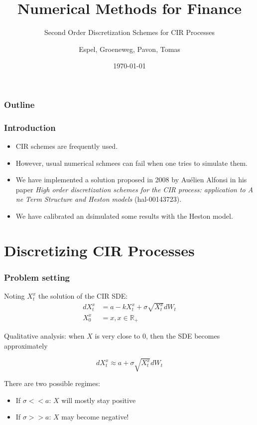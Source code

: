 \documentclass[12pt]{beamer}
\title{Numerical Methods for Finance}
\subtitle{Second Order Discretization Schemes for CIR Processes}
\author{Espel, Groeneweg, Pavon, Tomas}
\institute{Imperial College London}
\date{\today}
\begin{document}
\begin{frame}
    \titlepage
\end{frame}


\begin{frame}
\frametitle{Outline}
\tableofcontents
\end{frame}

\begin{frame}
\frametitle{Introduction}
\begin{itemize}
  \item CIR schemes are frequently used.
  \item However, usual numerical schmees can fail when one tries to simulate them.
  \item We have implemented a solution proposed in 2008 by Auélien Alfonsi in his paper \textit{High order discretization schemes for the CIR process: application to A ne Term Structure and Heston models} (hal-00143723).
  \item We have calibrated an dsimulated some results with the Heston model.
\end{itemize}
\end{frame}


\section{Discretizing CIR Processes}
\frame{\tableofcontents[currentsection]}

\begin{frame}
\frametitle{Problem setting}
Noting $X^{x}_{t}$ the solution of the CIR SDE:
\begin{align*}
dX^{x}_{t} & = a - kX^{x}_{t} + \sigma \sqrt{X^{x}_{t}} dW_{t} \\
X^{x}_{0} & = x, x \in \mathbb{R_{+}}
\end{align*}

Qualitative analysis: when $X$ is very close to $0$, then the SDE becomes approximately

$$
dX^{x}_{t} \approx a + \sigma \sqrt{X^{x}_{t}} dW_{t}
$$

There are two possible regimes:
\begin{itemize}
	\item If $\sigma << a$: $X$ will mostly stay positive
	\item If $\sigma >> a$: $X$ may become negative!
\end{itemize}
\end{frame}
\end{document}
